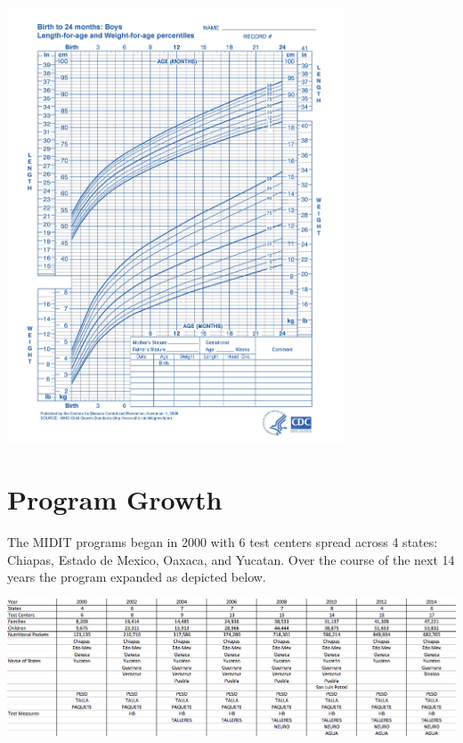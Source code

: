 \documentclass{article}
\begin{document}
\begin{center}
\includegraphics[width=100mm]{weight_length_babies.jpg}
\end{center}


\section{Program Growth}
The MIDIT programs began in 2000 with 6 test centers spread across 4 states: Chiapas, Estado de Mexico, Oaxaca, and Yucatan. Over the course of the next 14 years the program expanded as depicted below.
\begin{center}
\includegraphics[scale=.51]{growth}
\end{center}
\end{document}
